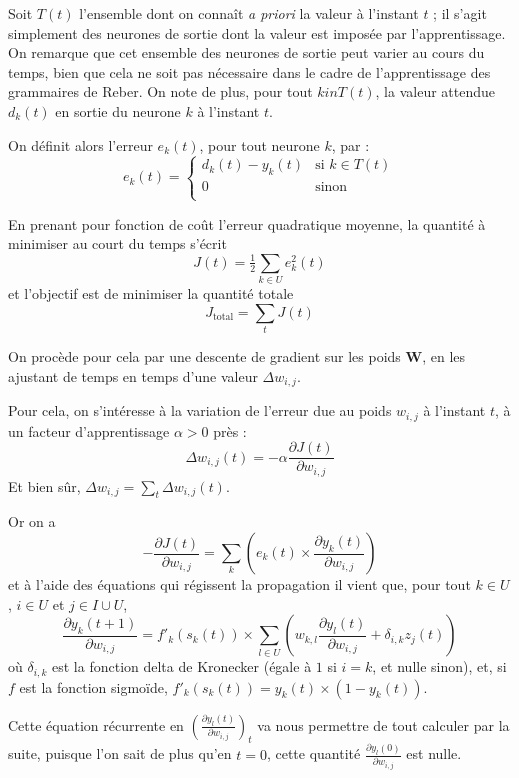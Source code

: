 Soit $T(t)$ l'ensemble dont on connaît \textit{a priori} la valeur à l'instant $t$ ; il s'agit simplement des neurones de sortie dont la valeur est imposée par l'apprentissage. On remarque que cet ensemble des neurones de sortie peut varier au cours du temps, bien que cela ne soit pas nécessaire dans le cadre de l'apprentissage des grammaires de Reber. On note de plus, pour tout $k in T(t)$, la valeur attendue $d_k(t)$ en sortie du neurone $k$ à l'instant $t$.

On définit alors l'erreur $e_k(t)$, pour tout neurone $k$, par :
\[ e_k(t) =  \begin{cases}
                  d_k(t) - y_k(t) & \text{si }k \in T(t)\\
                  0 & \text{sinon}\\
                \end{cases}
\]

En prenant pour fonction de coût l'erreur quadratique moyenne, la quantité à minimiser au court du temps s'écrit
\[ J(t) = \tfrac{1}{2} \sum_{k \in U} e_k^2(t) \]
et l'objectif est de minimiser la quantité totale
\[ J_{\text{total}} = \sum_{t} J(t) \]

On procède pour cela par une descente de gradient sur les poids $\boldsymbol{W}$, en les ajustant de temps en temps d'une valeur $\Delta w_{i,j}$.

Pour cela, on s'intéresse à la variation de l'erreur due au poids $w_{i,j}$ à l'instant $t$, à un facteur d'apprentissage $\alpha > 0$ près :
\[ \Delta w_{i,j}(t) = -\alpha \frac{\partial J(t)}{\partial w_{i,j}} \]
Et bien sûr, $\Delta w_{i,j} = \sum_t \Delta w_{i,j}(t)$.

Or on a
\[ -\frac{\partial J(t)}{\partial w_{i,j}} = \sum_k \left( e_k(t) \times \frac{\partial y_k(t)}{\partial w_{i,j}} \right) \]
et à l'aide des équations qui régissent la propagation il vient que, pour tout $k \in U$, $i \in U$ et $j \in I \cup U$,
\[ \frac{\partial y_k(t+1)}{\partial w_{i,j}} = f'_k(s_k(t)) \times \sum_{l \in U} \left( w_{k,l} \frac{\partial y_l(t)}{\partial w_{i,j}} + \delta_{i,k} z_j(t) \right) \]
où $\delta_{i,k}$ est la fonction delta de Kronecker (égale à $1$ si $i = k$, et nulle sinon), et, si $f$ est la fonction sigmoïde, $f'_k(s_k(t)) = y_k(t) \times (1 - y_k(t))$.

Cette équation récurrente en $\left( \frac{\partial y_l(t)}{\partial w_{i,j}} \right)_t$ va nous permettre de tout calculer par la suite, puisque l'on sait de plus qu'en $t=0$, cette quantité $\frac{\partial y_l(0)}{\partial w_{i,j}}$ est nulle.

